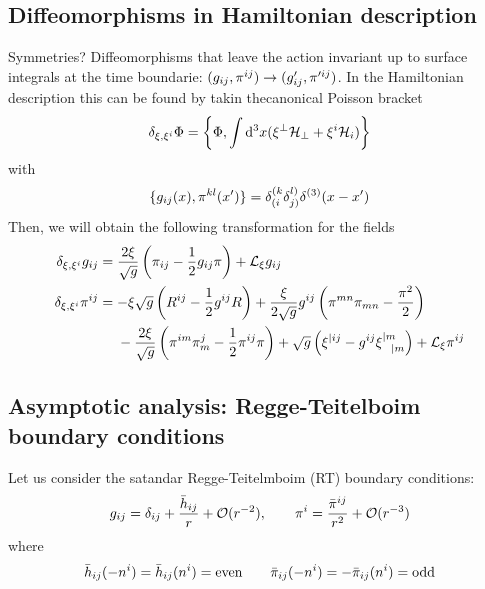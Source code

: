 \subsection{Diffeomorphisms in Hamiltonian description}
Symmetries? Diffeomorphisms that leave the action invariant up to surface integrals at the time boundarie: $(g_{ij},\pi^{ij})\to (g'_{ij},\pi'^{ij})$. In the Hamiltonian description this can be found by takin thecanonical  Poisson bracket
\begin{equation}
  \delta_{\xi,\xi^{i}}\Phi=\left\{\Phi,\int\dd^3x(\xi^\perp\mathcal{H}_\perp+\xi^{i}\mathcal{H}_i)\right\}
\end{equation}
with
\begin{equation}
  \{g_{ij}(x),\pi^{kl}(x')\}=\delta^{(k}_{(i}\delta^{l)}_{j)}\delta^{(3)}(x-x')
\end{equation}
Then, we will obtain the following transformation for the fields
\begin{align}
  \delta_{\xi,\xi^{i}}g_{ij}&=\frac{2\xi }{\sqrt{g}}\left(\pi_{ij}-\frac{1}{2}g_{ij}\pi \right)+\mathcal{L}_\xi g_{ij}\\
  \delta_{\xi,\xi^{i}}\pi^{ij}&=-\xi\sqrt{g}\left(R^{ij}-\frac{1}{2}g^{ij}R\right)+\frac{\xi}{2\sqrt{g}}g^{ij}\left(\pi^{mn}\pi_{mn}-\frac{\pi^2}{2}\right)\\&~~~~-\frac{2\xi}{\sqrt{g}}\left(\pi^{im}\pi^j_m -\frac{1}{2}\pi^{ij}\pi \right) +\sqrt{g}\left(\xi^{|ij}-g^{ij}\xi^{|m}_{~~|m}\right)+\mathcal{L}_\xi \pi^{ij}
\end{align}

\subsection{Asymptotic analysis: Regge-Teitelboim boundary conditions}
Let us consider the satandar Regge-Teitelmboim (RT) boundary conditions:
\begin{equation}
  g_{ij}=\delta_{ij}+\frac{\bar{h}_{ij}}{r}+\mathcal{O}(r^{-2}),\qquad \pi^{i}=\frac{\bar{\pi }^{ij}}{r^2}+\mathcal{O}(r^{-3})
\end{equation}
where
\begin{equation}
  \bar{h}_{ij}(-n^{i})=\bar{h}_{ij}(n^{i})=\text{even}\qquad \bar{\pi }_{ij}(-n^{i})=-\bar{\pi }_{ij}(n^{i})=\text{odd}
\end{equation}






















